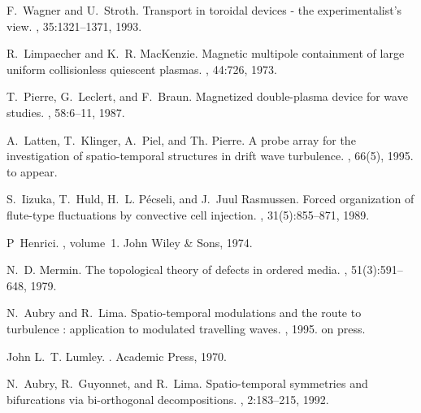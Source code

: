 \begin{thebibliography}{10}
F.~Wagner and U.~Stroth.
\newblock Transport in toroidal devices - the experimentalist's view.
, 35:1321--1371, 1993.

R.~Limpaecher and K.~R. {MacKenzie}.
\newblock Magnetic multipole containment of large uniform collisionless
  quiescent plasmas.
, 44:726, 1973.

T.~Pierre, G.~Leclert, and F.~Braun.
\newblock Magnetized double-plasma device for wave studies.
, 58:6--11, 1987.

A.~Latten, T.~Klinger, A.~Piel, and Th. Pierre.
\newblock A probe array for the investigation of spatio-temporal structures in
  drift wave turbulence.
, 66(5), 1995.
\newblock to appear.

S.~Iizuka, T.~Huld, H.~L. P\'ecseli, and J.~{Juul Rasmussen}.
\newblock Forced organization of flute-type fluctuations by convective cell
  injection.
, 31(5):855--871, 1989.

P~Henrici.
, volume~1.
\newblock John Wiley \& Sons, 1974.

N.~D. Mermin.
\newblock The topological theory of defects in ordered media.
, 51(3):591--648, 1979.

N.~Aubry and R.~Lima.
\newblock Spatio-temporal modulations and the route to turbulence : application
  to modulated travelling waves.
, 1995.
\newblock on press.

John L.~T. Lumley.
.
\newblock Academic Press, 1970.

N.~Aubry, R.~Guyonnet, and R.~Lima.
\newblock Spatio-temporal symmetries and bifurcations via bi-orthogonal
  decompositions.
, 2:183--215, 1992.

\end{thebibliography}

